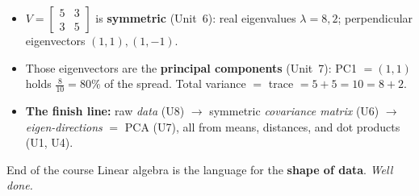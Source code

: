 \documentclass[aspectratio=169, 11pt]{beamer}
\begin{document}
\begin{frame}[t, plain]
  \begin{itemize}
    \setlength{\itemsep}{6pt}
    \item $V=\left[\begin{smallmatrix}5&3\\3&5\end{smallmatrix}\right]$ is \textbf{symmetric} (Unit~6):
          real eigenvalues $\lambda=8,2$; perpendicular eigenvectors $(1,1),(1,-1)$.
    \item Those eigenvectors are the \textbf{principal components} (Unit~7): PC1 $=(1,1)$ holds
          $\tfrac{8}{10}=80\%$ of the spread. Total variance $=$ trace $=5+5=10=8+2$.
    \item \textbf{The finish line:} raw \emph{data} (U8) $\to$ symmetric \emph{covariance matrix} (U6) $\to$
          \emph{eigen-directions} $=$ PCA (U7), all from means, distances, and dot products (U1, U4).
  \end{itemize}
  \vspace{2pt}
  \begin{block}{End of the course}
    Linear algebra is the language for the \textbf{shape of data}. \emph{Well done.}
  \end{block}
\end{frame}
\end{document}
